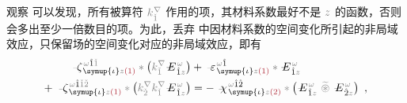 观察  可以发现，所有被算符 $\mathcolor{gray}{k^\nabla_{\check{1}}}$ 作用的项，其材料系数最好不是 $\mathcolor{gray}{z}$ 的函数，否则会多出至少一倍数目的项。为此，丢弃  中因材料系数的空间变化所引起的非局域效应，只保留场的空间变化对应的非局域效应，即有
\begin{subequations}
	\abovedisplayskip=-8pt
\begin{align}
	\Xint{\begin{smallmatrix} ~ \\ {}^{}_{\mathcolor{gray}{-}} \\ ~ \end{smallmatrix}}{12}{\zeta}^{\;\! \mathcolor{gray}{\omega} \hat{1} \mathcolor{gray}{\check{1}}}_{\;\! \symup{\iota} \mathcolor{gray}{z} \textcolor{Maroon}{(1)}} \mathcolor{gray}{*} \left( \mathcolor{gray}{k^\nabla_{\check{1}}} \Xint{\mathcolor{gray}{-}}{295}{E}^{\;\!\mathcolor{gray}{\omega}}_{\;\! \hat{1} \mathcolor{gray}{z}} \right) &+ \Xint{\begin{smallmatrix} ~ \\ {}^{}_{\mathcolor{gray}{-}} \\ ~ \end{smallmatrix}}{16}{\varepsilon}^{\;\! \mathcolor{gray}{\omega} \hat{1}}_{\;\! \symup{\iota} \mathcolor{gray}{z} \textcolor{Maroon}{(1)}} \mathcolor{gray}{*} \Xint{\mathcolor{gray}{-}}{295}{E}^{\;\!\mathcolor{gray}{\omega}}_{\;\! \hat{1} \mathcolor{gray}{z}}  \label{eq:nonlinear(2)-wave_wkrho-simplify3} \\ 
	+~ \Xint{\begin{smallmatrix} ~ \\ {}^{}_{\mathcolor{gray}{-}} \\ ~ \end{smallmatrix}}{12}{\zeta}^{\;\! \mathcolor{gray}{\omega} \hat{1} \mathcolor{gray}{\check{1} \check{2}}}_{\;\! \symup{\iota} \mathcolor{gray}{z} \textcolor{Maroon}{(1)}} \mathcolor{gray}{*} \left( \mathcolor{gray}{k^\nabla_{\check{2}}} \mathcolor{gray}{k^\nabla_{\check{1}}} \Xint{\mathcolor{gray}{-}}{295}{E}^{\;\!\mathcolor{gray}{\omega}}_{\;\! \hat{1} \mathcolor{gray}{z}} \right) &= - ~\Xint{{}^{}_{\mathcolor{gray}{-}}}{23}{\chi}^{\;\! \mathcolor{gray}{\omega} \hat{1} \hat{2}}_{\;\! \symup{\iota} \mathcolor{gray}{z} \textcolor{Maroon}{(2)}} \mathcolor{gray}{*} \left( \Xint{\mathcolor{gray}{-}}{295}{E}^{\;\!\mathcolor{gray}{\omega}}_{\;\! \hat{1} \mathcolor{gray}{z}} ~\mathcolor{gray}{\widetilde \circledast}~ \Xint{\mathcolor{gray}{-}}{295}{E}^{\;\!\mathcolor{gray}{\omega}}_{\;\! \hat{2} \mathcolor{gray}{z}} \right)~, \label{eq:nonlinear(2)-wave_wkrho-simplify3-2}
\end{align}
\end{subequations}

